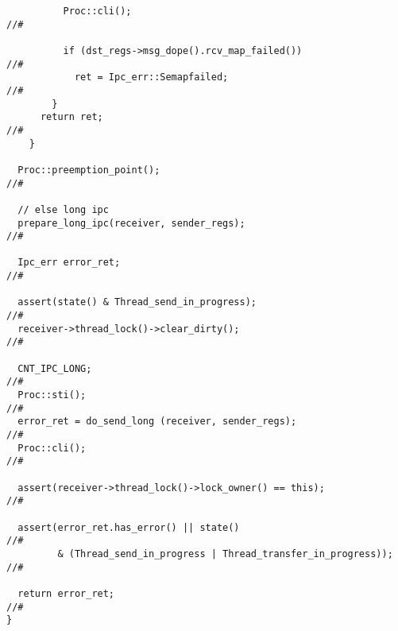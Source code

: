 \begin{lstlisting}
          Proc::cli();                                                     //#

          if (dst_regs->msg_dope().rcv_map_failed())                       //#
            ret = Ipc_err::Semapfailed;                                    //#
        }
      return ret;                                                          //#
    }

  Proc::preemption_point();                                                //#

  // else long ipc
  prepare_long_ipc(receiver, sender_regs);                                 //#

  Ipc_err error_ret;                                                       //#

  assert(state() & Thread_send_in_progress);                               //#
  receiver->thread_lock()->clear_dirty();                                  //#

  CNT_IPC_LONG;                                                            //#
  Proc::sti();                                                             //#
  error_ret = do_send_long (receiver, sender_regs);                        //#
  Proc::cli();                                                             //#

  assert(receiver->thread_lock()->lock_owner() == this);                   //#

  assert(error_ret.has_error() || state()                                  //#
         & (Thread_send_in_progress | Thread_transfer_in_progress));       //#

  return error_ret;                                                        //#
}
\end{lstlisting}